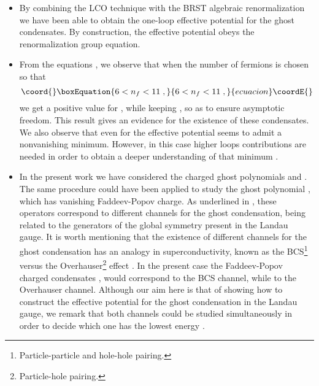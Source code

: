 \documentclass[a4paper,12pt]{article}
\begin{document}
\begin{itemize}
\item  By combining the LCO technique with the BRST algebraic
renormalization we have been able to obtain the one-loop effective potential
for the ghost condensates. By construction, the effective potential \coordHE{} obeys the renormalization group
equation.

\item  From the equations \myHighlight{$\left( \ref{ga1}\right) $}\coordHE{}, \myHighlight{$\left( \ref{ga2}%
\right) $}\coordHE{} we observe that when the number of fermions \coordHE{} is chosen so
that 
\begin{equation}\coord{}\boxEquation{
6<n_{f}<11\;,  \label{nf}
}{
6<n_{f}<11\;,  }{ecuacion}\coordE{}\end{equation}
we get a positive value for \coordHE{}, while keeping \coordHE{},
so as to ensure asymptotic freedom. This result gives an evidence for the
existence of these condensates. We also observe that even for \coordHE{}
the effective potential \coordHE{} seems
to admit a nonvanishing minimum. However, in this case higher loops
contributions are needed in order to obtain a deeper understanding of that
minimum \cite{w}.

\item  In the present work we have considered the charged ghost polynomials \coordHE{} and \coordHE{}. The same
procedure could have been applied to study the ghost polynomial \coordHE{}, which has vanishing Faddeev-Popov charge. As underlined
in \cite{work}, these operators correspond to different channels for the
ghost condensation, being related to the generators of the global symmetry \coordHE{} present in the Landau gauge. It is worth mentioning that the
existence of different channels for the ghost condensation has an analogy in
superconductivity, known as the BCS\footnote{%
Particle-particle and hole-hole pairing.} versus the Overhauser\footnote{%
Particle-hole pairing.} effect \cite{ov}. In the present case the
Faddeev-Popov charged condensates \coordHE{}, \coordHE{} would correspond to the BCS channel, while \coordHE{} to the Overhauser
channel. Although our aim here is that of showing how to construct the
effective potential for the ghost condensation in the Landau gauge, we
remark that both channels could be studied simultaneously in order to decide
which one has the lowest energy \cite{w}.


\end{itemize}
\end{document}
